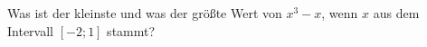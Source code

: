 \item Was ist der kleinste und was der größte Wert von $x^3-x$, wenn $x$ aus dem Intervall $[-2;1]$ stammt?

